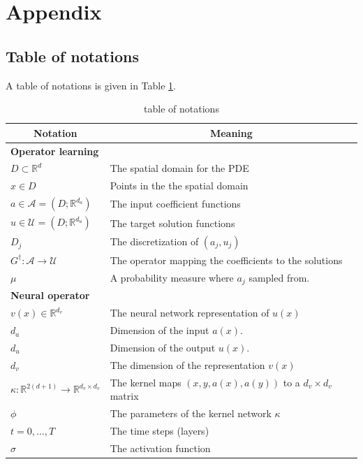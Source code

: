 \documentclass{article} %
\newcommand{\R}{\mathbb{R}}
\newcommand{\A}{\mathcal{A}}
\newcommand{\U}{\mathcal{U}}
\newcommand{\Ftrue}{G^\dagger}
\begin{document}



\newpage
\appendix
\section{Appendix}

\subsection{Table of notations}
A table of notations is given in Table \ref{table:notations}.

\begin{table}[h]
\caption{table of notations}
\label{table:notations}
\begin{center}
\begin{tabular}{|l|l|}
\multicolumn{1}{c}{\bf Notation} 
&\multicolumn{1}{c}{\bf Meaning}\\
\hline 
{\bf Operator learning} &\\
$D \subset \R^d$  & The spatial domain for the PDE \\
$x \in D$  & Points in the the spatial domain \\
$a \in \A = (D;\R^{d_a})$  & The input coefficient functions \\
$u \in \U = (D;\R^{d_u})$  & The target solution functions \\
$D_j$ & The discretization of $(a_j, u_j)$\\
$\Ftrue: \A \to \U$  & The operator mapping the coefficients to the solutions\\
$\mu$ & A probability measure where $a_j$ sampled from.\\
\hline
{\bf Neural operator} &\\
$v(x) \in \R^{d_v}$  & The neural network representation of $u(x)$ \\
$d_a$ & Dimension of the input $a(x)$.\\
$d_u$ & Dimension of the output $u(x)$.\\
$d_v$ & The dimension of the representation $v(x)$\\
$\kappa : \R^{2(d+1)} \to \R^{d_v \times d_v}$  & The kernel maps $(x,y,a(x),a(y))$ to a $d_v \times d_v$ matrix\\
$\phi$  & The parameters of the kernel network $\kappa$ \\
$t = 0,\ldots,T$  & The time steps (layers)  \\
$\sigma $  & The activation function  \\
\hline 

\end{tabular}
\end{center}
\end{table}
\end{document}
